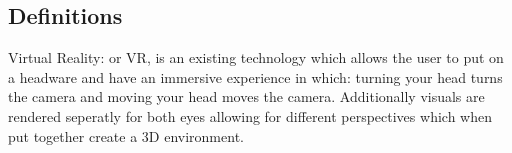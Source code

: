 \subsection{Definitions}

Virtual Reality: or VR, is an existing technology which allows the user to put on a headware and have an immersive experience in which:
turning your head turns the camera and
moving your head moves the camera.
Additionally visuals are rendered seperatly for both eyes allowing for different perspectives which when put together create a 3D environment.


